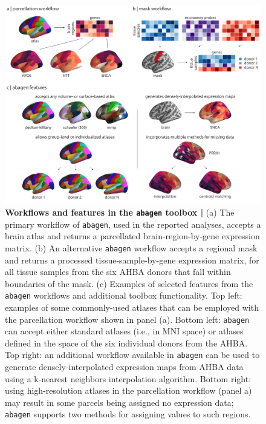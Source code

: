 \documentclass[12pt,aps,pra,reprint,showkeys]{revtex4-1}
\begin{document}
\begin{figure}[htp]
  \begin{center}
    \centerline{\includegraphics[width=\textwidth]{abagen_workflows.png}}
    \caption{
      \textbf{Workflows and features in the \texttt{abagen} toolbox |}
      (a) The primary workflow of \texttt{abagen}, used in the reported analyses, accepts a brain atlas and returns a parcellated brain-region-by-gene expression matrix.
      (b) An alternative \texttt{abagen} workflow accepts a regional mask and returns a processed tissue-sample-by-gene expression matrix, for all tissue samples from the six AHBA donors that fall within boundaries of the mask.
      (c) Examples of selected features from the \texttt{abagen} workflows and additional toolbox functionality.
      Top left: examples of some commonly-used atlases that can be employed with the parcellation workflow shown in panel (a).
      Bottom left: \texttt{abagen} can accept either standard atlases (i.e., in MNI space) or atlases defined in the space of the six individual donors from the AHBA.
      Top right: an additional workflow available in \texttt{abagen} can be used to generate densely-interpolated expression maps from AHBA data using a k-nearest neighbors interpolation algorithm.
      Bottom right: using high-resolution atlases in the parcellation workflow (panel a) may result in some parcels being assigned no expression data; \texttt{abagen} supports two methods for assigning values to such regions.
      }
    \label{figure-abagen-workflows}
  \end{center}
\end{figure}
\end{document}
